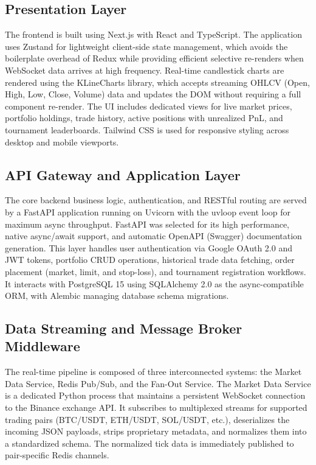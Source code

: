 \documentclass[conference]{IEEEtran}
\begin{document}
\subsection{Presentation Layer}
The frontend is built using Next.js with React and TypeScript. The application uses Zustand for lightweight client-side state management, which avoids the boilerplate overhead of Redux while providing efficient selective re-renders when WebSocket data arrives at high frequency. Real-time candlestick charts are rendered using the KLineCharts library, which accepts streaming OHLCV (Open, High, Low, Close, Volume) data and updates the DOM without requiring a full component re-render. The UI includes dedicated views for live market prices, portfolio holdings, trade history, active positions with unrealized PnL, and tournament leaderboards. Tailwind CSS is used for responsive styling across desktop and mobile viewports.

\subsection{API Gateway and Application Layer}
The core backend business logic, authentication, and RESTful routing are served by a FastAPI application running on Uvicorn with the uvloop event loop for maximum async throughput. FastAPI was selected for its high performance, native async/await support, and automatic OpenAPI (Swagger) documentation generation. This layer handles user authentication via Google OAuth 2.0 and JWT tokens, portfolio CRUD operations, historical trade data fetching, order placement (market, limit, and stop-loss), and tournament registration workflows. It interacts with PostgreSQL 15 using SQLAlchemy 2.0 as the async-compatible ORM, with Alembic managing database schema migrations.

\subsection{Data Streaming and Message Broker Middleware}
The real-time pipeline is composed of three interconnected systems: the Market Data Service, Redis Pub/Sub, and the Fan-Out Service. The Market Data Service is a dedicated Python process that maintains a persistent WebSocket connection to the Binance exchange API. It subscribes to multiplexed streams for supported trading pairs (BTC/USDT, ETH/USDT, SOL/USDT, etc.), deserializes the incoming JSON payloads, strips proprietary metadata, and normalizes them into a standardized schema. The normalized tick data is immediately published to pair-specific Redis channels.
\end{document}
